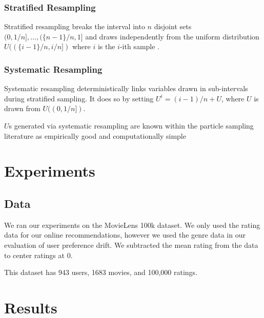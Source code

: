 \documentclass{article}
\begin{document}
\subsubsection{Stratified Resampling}
Stratified resampling breaks the interval into $n$ disjoint sets $(0, 1/n], ... , (\{n - 1\} / n, 1]$ and draws independently from the uniform distribution $U((\{i - 1\}/n, i/n])$ where $i$ is the $i$-ith sample \cite{douc2005comparison}.

\subsubsection{Systematic Resampling}
Systematic resampling deterministically links variables drawn in sub-intervals during stratified sampling. It does so by setting $U^i = (i-1)/n + U$, where $U$ is drawn from $U((0, 1/n])$.

$U$s generated via systematic resampling are known within the particle sampling literature as empirically good and computationally simple \cite{douc2005comparison}

\section{Experiments}

\subsection{Data}
We ran our experiments on the MovieLens 100k dataset. We only used the rating data for our
online recommendations, however we used the genre data in our evaluation of user preference
drift. We subtracted the mean rating from the data to center ratings at 0.

This dataset has 943 users, 1683 movies, and 100,000 ratings.

\section{Results}
\end{document}
